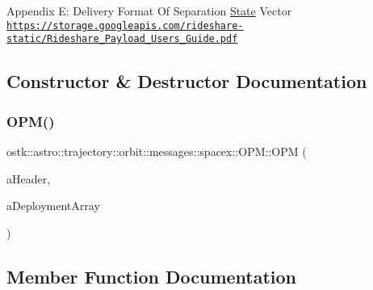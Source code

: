 Appendix E\+: Delivery Format Of Separation \hyperlink{classostk_1_1astro_1_1trajectory_1_1_state}{State} Vector \href{https://storage.googleapis.com/rideshare-static/Rideshare_Payload_Users_Guide.pdf}{\tt https\+://storage.\+googleapis.\+com/rideshare-\/static/\+Rideshare\+\_\+\+Payload\+\_\+\+Users\+\_\+\+Guide.\+pdf} 

\subsection{Constructor \& Destructor Documentation}
\mbox{\label{classostk_1_1astro_1_1trajectory_1_1orbit_1_1messages_1_1spacex_1_1_o_p_m_a2c7d8dad60a7cabf0a3a24bae0972a89}} 
\subsubsection{\texorpdfstring{O\+P\+M()}{OPM()}}
{\footnotesize\ttfamily ostk\+::astro\+::trajectory\+::orbit\+::messages\+::spacex\+::\+O\+P\+M\+::\+O\+PM (\begin{DoxyParamCaption}\item[{const \hyperlink{structostk_1_1astro_1_1trajectory_1_1orbit_1_1messages_1_1spacex_1_1_o_p_m_1_1_header}{O\+P\+M\+::\+Header} \&}]{a\+Header,  }\item[{const Array$<$ \hyperlink{structostk_1_1astro_1_1trajectory_1_1orbit_1_1messages_1_1spacex_1_1_o_p_m_1_1_deployment}{O\+P\+M\+::\+Deployment} $>$ \&}]{a\+Deployment\+Array }\end{DoxyParamCaption})}



\subsection{Member Function Documentation}
\mbox{\label{classostk_1_1astro_1_1trajectory_1_1orbit_1_1messages_1_1spacex_1_1_o_p_m_a1cd4c53e5959572f27a3f77a0d8c0db3}} 
